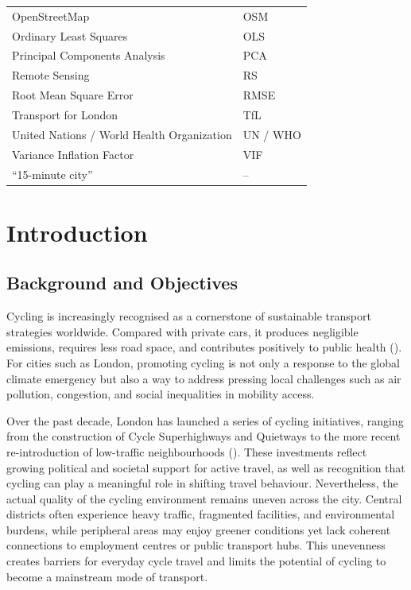 \documentclass[
  12pt,
  oneside]{book}
\begin{document}
\begin{table}
\begin{tabular}{ll}
OpenStreetMap & OSM\\
Ordinary Least Squares & OLS\\
Principal Components Analysis & PCA\\
Remote Sensing & RS\\
\addlinespace
Root Mean Square Error & RMSE\\
Transport for London & TfL\\
United Nations / World Health Organization & UN / WHO\\
Variance Inflation Factor & VIF\\
“15-minute city” & –\\
\bottomrule
\end{tabular}
\end{table}

\chapter{Introduction}\label{introduction}


\section{Background and Objectives}\label{background-and-objectives}

Cycling is increasingly recognised as a cornerstone of sustainable transport strategies worldwide. Compared with private cars, it produces negligible emissions, requires less road space, and contributes positively to public health (\textcite{pucher_cycling_2017}). For cities such as London, promoting cycling is not only a response to the global climate emergency but also a way to address pressing local challenges such as air pollution, congestion, and social inequalities in mobility access.

Over the past decade, London has launched a series of cycling initiatives, ranging from the construction of Cycle Superhighways and Quietways to the more recent re-introduction of low-traffic neighbourhoods (\textcite{tfl_cycling_action_2018}). These investments reflect growing political and societal support for active travel, as well as recognition that cycling can play a meaningful role in shifting travel behaviour. Nevertheless, the actual quality of the cycling environment remains uneven across the city. Central districts often experience heavy traffic, fragmented facilities, and environmental burdens, while peripheral areas may enjoy greener conditions yet lack coherent connections to employment centres or public transport hubs. This unevenness creates barriers for everyday cycle travel and limits the potential of cycling to become a mainstream mode of transport.
\end{document}
